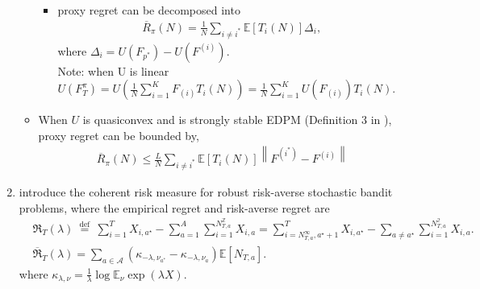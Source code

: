 \documentclass{article}
\begin{document}
\begin{enumerate}
\begin{itemize}
\begin{itemize}
                \item proxy regret can be decomposed into
                \begin{align}
                    \overline{R}_{\pi}(N)=\frac{1}{N} \sum_{i \neq i^{*}} \mathbb{E}\left[T_{i}(N)\right] \Delta_{i},
                \end{align}
                where $\Delta_{i}=U\left(F_{p^{*}}\right)-U\left(F^{(i)}\right)$.\\
                Note: when U is linear $U(F_T^\pi) = U(\frac{1}{N} \sum_{i=1}^K F_{(i)} T_i(N)) = \frac{1}{N} \sum_{i=1}^K U(F_{(i)}) T_i(N)$.
                \end{itemize}
            \item When $U$ is quasiconvex and is strongly stable EDPM (Definition 3 in \cite{cassel2018general}), proxy regret can be bounded by,
                \begin{align}
                    \overline{R}_{\pi}(N) \leq \frac{L}{N} \sum_{i \neq i^{*}} \mathbb{E}\left[T_{i}(N)\right]\left\|F^{\left(i^{*}\right)}-F^{(i)}\right\|
                \end{align}
        \end{itemize}
        \item \textcite{maillard2013robust} introduce the coherent risk measure for robust risk-averse stochastic bandit problems, where the empirical regret and risk-averse regret are
        \begin{align}
            & \mathfrak{R}_{T}(\lambda) \stackrel{\text { def }}{=} \sum_{i=1}^{T} X_{i, a^{\star}}-\sum_{a=1}^{A} \sum_{i=1}^{N_{T, a}^{\mathbb{Z}}} X_{i, a}=\sum_{i=N_{T, a}^{\infty}, a^{\star}+1}^{T} X_{i, a^{\star}}-\sum_{a \neq a^{\star}} \sum_{i=1}^{N_{T, a}^{\mathbb{2}}} X_{i, a}.\\
            & \overline{\mathfrak{R}}_{T}(\lambda)=\sum_{a \in \mathcal{A}}\left(\kappa_{-\lambda, \nu_{a^{*}}}-\kappa_{-\lambda, \nu_{a}}\right) \mathbb{E}\left[N_{T, a}\right].
        \end{align}
        where $\kappa_{\lambda, \nu}=\frac{1}{\lambda} \log \mathbb{E}_{\nu} \exp (\lambda X)$.
    \end{enumerate}
       

\printbibliography
\end{document}
